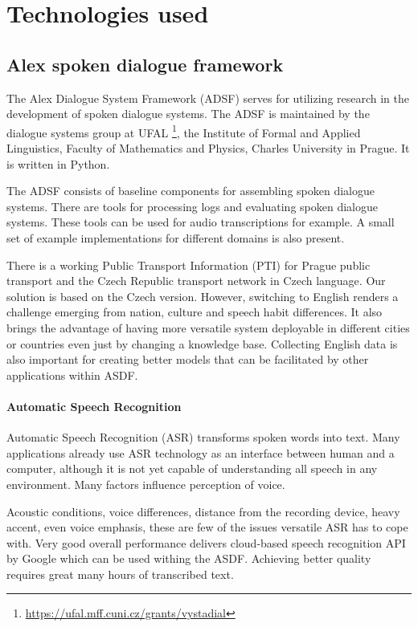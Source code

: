 \chapter{Technologies used}

\section{Alex spoken dialogue framework}

The Alex Dialogue System Framework (ADSF) serves for utilizing research in the development of spoken dialogue systems.
The ADSF is maintained by the dialogue systems group at UFAL \footnote{\url{https://ufal.mff.cuni.cz/grants/vystadial}}, the Institute of Formal and Applied Linguistics, Faculty of Mathematics and Physics, Charles University in Prague.
It is written in Python.

The ADSF consists of baseline components for assembling spoken dialogue systems.
There are tools for processing logs and evaluating spoken dialogue systems.
These tools can be used for audio transcriptions for example.
A small set of example implementations for different domains is also present.

There is a working Public Transport Information (PTI) \cite{ptics} for Prague public transport and the Czech Republic transport network in Czech language.
Our solution is based on the Czech version.
However, switching to English renders a challenge emerging from nation, culture and speech habit differences.
It also brings the advantage of having more versatile system deployable in different cities or countries even just by changing a knowledge base.
Collecting English data is also important for creating better models that can be facilitated by other applications within ASDF.



\subsubsection{Automatic Speech Recognition}

Automatic Speech Recognition (ASR) transforms spoken words into text.
Many applications already use ASR technology as an interface between human and a computer, although it is not yet capable of understanding all speech in any environment.
Many factors influence perception of voice.

Acoustic conditions, voice differences, distance from the recording device, heavy accent, even voice emphasis, these are few of the issues versatile ASR has to cope with.
Very good overall performance delivers cloud-based speech recognition API by Google which can be used withing the ASDF.
Achieving better quality requires great many hours of transcribed text.

